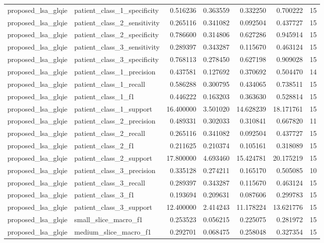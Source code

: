 \begin{tabular}{llrrrrr}
proposed_lsa_glqie & patient_class_1_specificity & 0.516236 & 0.363559 & 0.332250 & 0.700222 & 15 \\
proposed_lsa_glqie & patient_class_2_sensitivity & 0.265116 & 0.341082 & 0.092504 & 0.437727 & 15 \\
proposed_lsa_glqie & patient_class_2_specificity & 0.786600 & 0.314806 & 0.627286 & 0.945914 & 15 \\
proposed_lsa_glqie & patient_class_3_sensitivity & 0.289397 & 0.343287 & 0.115670 & 0.463124 & 15 \\
proposed_lsa_glqie & patient_class_3_specificity & 0.768113 & 0.278450 & 0.627198 & 0.909028 & 15 \\
proposed_lsa_glqie & patient_class_1_precision & 0.437581 & 0.127692 & 0.370692 & 0.504470 & 14 \\
proposed_lsa_glqie & patient_class_1_recall & 0.586288 & 0.300795 & 0.434065 & 0.738511 & 15 \\
proposed_lsa_glqie & patient_class_1_f1 & 0.446222 & 0.163203 & 0.363630 & 0.528814 & 15 \\
proposed_lsa_glqie & patient_class_1_support & 16.400000 & 3.501020 & 14.628239 & 18.171761 & 15 \\
proposed_lsa_glqie & patient_class_2_precision & 0.489331 & 0.302033 & 0.310841 & 0.667820 & 11 \\
proposed_lsa_glqie & patient_class_2_recall & 0.265116 & 0.341082 & 0.092504 & 0.437727 & 15 \\
proposed_lsa_glqie & patient_class_2_f1 & 0.211625 & 0.210374 & 0.105161 & 0.318089 & 15 \\
proposed_lsa_glqie & patient_class_2_support & 17.800000 & 4.693460 & 15.424781 & 20.175219 & 15 \\
proposed_lsa_glqie & patient_class_3_precision & 0.335128 & 0.274211 & 0.165170 & 0.505085 & 10 \\
proposed_lsa_glqie & patient_class_3_recall & 0.289397 & 0.343287 & 0.115670 & 0.463124 & 15 \\
proposed_lsa_glqie & patient_class_3_f1 & 0.193694 & 0.209631 & 0.087606 & 0.299783 & 15 \\
proposed_lsa_glqie & patient_class_3_support & 12.400000 & 2.414243 & 11.178224 & 13.621776 & 15 \\
proposed_lsa_glqie & small_slice_macro_f1 & 0.253523 & 0.056215 & 0.225075 & 0.281972 & 15 \\
proposed_lsa_glqie & medium_slice_macro_f1 & 0.292701 & 0.068475 & 0.258048 & 0.327354 & 15 \\

\end{tabular}
